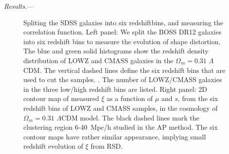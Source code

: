 \documentclass[prl,twocolumn,superscriptaddress,aps,amsmath,amssymb,nofootinbib,altaffilletter]{revtex4}
\begin{document}
{\it Results.}---

\begin{figure}
   \caption{\label{fig_TpCF}
   Spliting the SDSS galaxies into six redshiftbins, and measuring the correlation function.
   Left panel: We split the BOSS DR12 galaxies into six redshift bins to measure the evolution of shape distortion.
   The blue and green solid histograms show the redshift density distribution of LOWZ and CMASS galaxies in the $\Omega_m=0.31$ $\Lambda$CDM. 
   The vertical dashed lines define the six redshift bins that are used to cut the samples.                                       .
   The number of LOWZ/CMASS galaxies in the three low/high redshift bins are listed.
   Right panel: 2D contour map of measured $\xi$ as a function of $\mu$ and $s$, from the six redshift bins of LOWZ and CMASS samples, 
      in the cosmology of $\Omega_m=0.31$ $\Lambda$CDM model.
    The black dashed lines mark the clustering region 6-40\ Mpc/h studied in the AP method.
    The six contour maps have rather similar appearance, implying small redshift evolution of $\xi$ from RSD.
   }
\end{figure}
\end{document}
